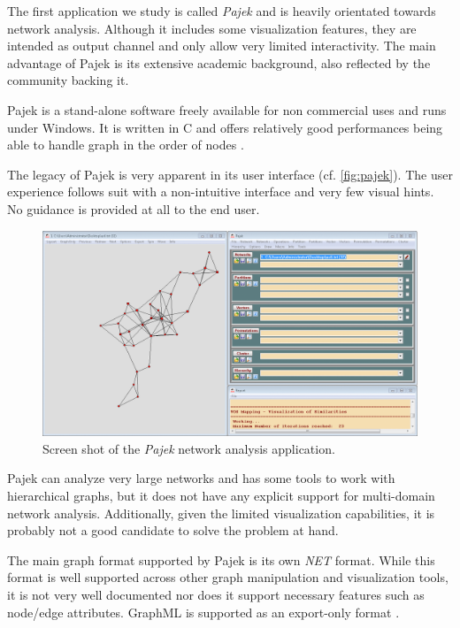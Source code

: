 The first application we study is called \emph{Pajek} \cite{pajek} and is heavily orientated towards network analysis. Although it includes some visualization features, they are intended as output channel and only allow very limited interactivity. The main advantage of Pajek is its extensive academic background, also reflected by the community backing it.

Pajek is a stand-alone software freely available for non commercial uses and runs under Windows. It is written in C and offers relatively good performances being able to handle graph in the order of  nodes \cite{compa}.

The legacy of Pajek is very apparent in its user interface (cf. \vref{fig:pajek}). The user experience follows suit with a non-intuitive interface and very few visual hints. No guidance is provided at all to the end user.

\begin{figure}
  \centering
  \includegraphics[width=.8\linewidth]{images/pajek}
  \caption[Screen shot of Pajek.]{Screen shot of the \emph{Pajek} network analysis application.}
  \label{fig:pajek}
\end{figure}

Pajek can analyze very large networks and has some tools to work with hierarchical graphs, but it does not have any explicit support for multi-domain network analysis. Additionally, given the limited visualization capabilities, it is probably not a good candidate to solve the problem at hand.

The main graph format supported by Pajek is its own \emph{NET} format. While this format is well supported across other graph manipulation and visualization tools, it is not very well documented nor does it support necessary features such as node/edge attributes. GraphML is supported as an export-only format \cite{compa,net,pajekman}.

